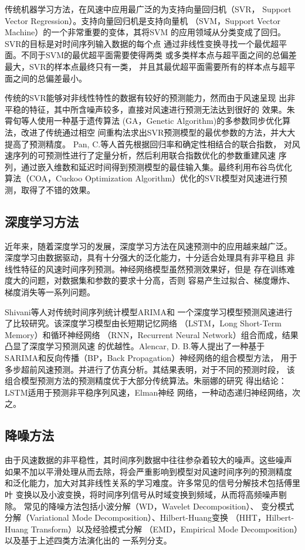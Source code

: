 \documentclass[AutoFakeBold]{LZUThesis}
\begin{document}
传统机器学习方法，在风速中应用最广泛的为支持向量回归机（SVR，
Support Vector Regression）。支持向量回归机是支持向量机
（SVM，Support Vector Machine）的一个非常重要的变体，其将SVM
的应用领域从分类变成了回归。SVR的目标是对时间序列输入数据的每个点
通过非线性变换寻找一个最优超平面。不同于SVM的最优超平面需要使得两类
或多类样本点与超平面之间的总偏差最大，SVR的样本点最终只有一类，
并且其最优超平面需要所有的样本点与超平面之间的总偏差最小。

传统的SVR能够对非线性特性的数据有较好的预测能力，然而由于风速呈现
出非平稳的特征，其中所含噪声较多，直接对风速进行预测无法达到很好的
效果。朱霄旬等人\cite{朱霄旬2017遗传算法对}使用一种基于遗传算法
(GA，Genetic Algorithm)的多参数同步优化算法，改进了传统通过相空
间重构法求出SVR预测模型的最优参数的方法，并大大提高了预测精度。
Pan, C.等人\cite{2018Hybrid}首先根据回归率和确定性相结合的联合指数，
对风速序列的可预测性进行了定量分析，然后利用联合指数优化的参数重建风速
序列，通过嵌入维数和延迟时间得到预测模型的最佳输入集。最终利用布谷鸟优化
算法（COA，Cuckoo Optimization Algorithm）优化的SVR模型对风速进行预
测，取得了不错的效果。

\subsection{深度学习方法}

近年来，随着深度学习的发展，深度学习方法在风速预测中的应用越来越广泛。
深度学习由数据驱动，具有十分强大的泛化能力，十分适合处理具有非平稳且
非线性特征的风速时间序列预测。神经网络模型虽然预测效果好，但是
存在训练难度大的问题，对数据集和参数的要求十分高，否则
容易产生过拟合、梯度爆炸、梯度消失等一系列问题。

Shivani等人\cite{Shivani2019A}对传统时间序列统计模型ARIMA和
一个深度学习模型预测风速进行了比较研究。该深度学习模型由长短期记忆网络
（LSTM，Long Short-Term Memory）和循环神经网络
（RNN，Recurrent Neural Network）组合而成，结果凸显了深度学习预测风速
的优越性。Alencar, D. B.等人\cite{alencar2018hybrid}提出了一种基于
SARIMA和反向传播（BP，Back Propagation）神经网络的组合模型方法，
用于多步超前风速预测。并进行了仿真分析。其结果表明，对于不同的预测时段，
该组合模型预测方法的预测精度优于大部分传统算法。朱丽娜的研究
\cite{朱丽娜2021风电}得出结论：LSTM适用于预测非平稳序列风速，Elman神经
网络，一种动态递归神经网络，次之。

\subsection{降噪方法}
由于风速数据的非平稳性，其时间序列数据中往往参杂着较大的噪声。这些噪声
如果不加以平滑处理从而去除，将会严重影响到模型对风速时间序列的预测精度
和泛化能力，加大对其非线性关系的学习难度。许多常见的信号分解技术包括傅里叶
变换以及小波变换，将时间序列信号从时域变换到频域，从而将高频噪声剔除。
常见的降噪方法包括小波分解（WD，Wavelet Decomposition）、
变分模式分解（Variational Mode Decomposition）、Hilbert-Huang变换
（HHT，Hilbert-Huang Transform）以及经验模式分解
（EMD，Empirical Mode Decomposition）以及基于上述四类方法演化出的
一系列分支。
\end{document}
